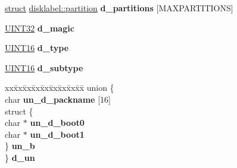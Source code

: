 \begin{DoxyCompactItemize}
\mbox{\label{structdisklabel_a44a707552b0a0f0ce0032c8a0afafc7e}} 
\hyperlink{interfacestruct}{struct} \hyperlink{structdisklabel_1_1partition}{disklabel\+::partition} {\bfseries d\+\_\+partitions} \mbox{[}M\+A\+X\+P\+A\+R\+T\+I\+T\+I\+O\+NS\mbox{]}
\item 
\mbox{\label{structdisklabel_a433b5a2888ae29c9ba0ee33a6b4584f3}} 
\hyperlink{_processor_bind_8h_ae1e6edbbc26d6fbc71a90190d0266018}{U\+I\+N\+T32} {\bfseries d\+\_\+magic}
\item 
\mbox{\label{structdisklabel_a44730180910b2ddc902cf0b962725491}} 
\hyperlink{_processor_bind_8h_a09f1a1fb2293e33483cc8d44aefb1eb1}{U\+I\+N\+T16} {\bfseries d\+\_\+type}
\item 
\mbox{\label{structdisklabel_a0c295ec87db0cd6322ee57ae28103ea7}} 
\hyperlink{_processor_bind_8h_a09f1a1fb2293e33483cc8d44aefb1eb1}{U\+I\+N\+T16} {\bfseries d\+\_\+subtype}
\item 
\mbox{\label{structdisklabel_aadf3b114f52d155e593e8a825d514576}} 
\begin{tabbing}
xx\=xx\=xx\=xx\=xx\=xx\=xx\=xx\=xx\=\kill
union \{\\
\>char {\bfseries un\_d\_packname} \mbox{[}16\mbox{]}\\
\>struct \{\\
\>\>char $\ast$ {\bfseries un\_d\_boot0}\\
\>\>char $\ast$ {\bfseries un\_d\_boot1}\\
\>\} {\bfseries un\_b}\\
\} {\bfseries d\_un}\\


\end{tabbing}
\end{DoxyCompactItemize}
